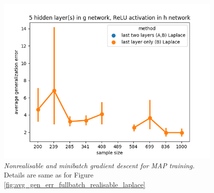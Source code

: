 \documentclass[11pt]{article}
\numberwithin{equation}{section}
\theoremstyle{plain}
\theoremstyle{definition}
\begin{document}
\begin{figure}[t!]
\begin{center}
		\includegraphics[scale=0.45]{laplace_taskid7.png}
	\end{center}
	\caption{\textit{Nonrealisable and minibatch gradient descent for MAP training.} Details are same as for Figure \ref{fig:avg_gen_err_fullbatch_realisable_laplace}
	}
	\label{fig:avg_gen_err_minibatch_nonrealisable_laplace}
\end{figure}
\end{document}
